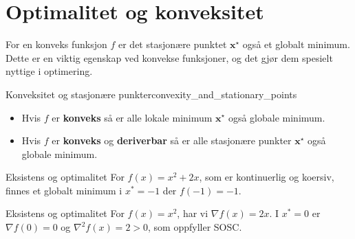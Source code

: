 \section{Optimalitet og konveksitet}
\label{sec:optimality_and_convexity}
For en konveks funksjon \(f\) er det stasjonære punktet \(\mathbf{x}^\star\) også et globalt minimum. Dette er en viktig egenskap ved konvekse funksjoner, og det gjør dem spesielt nyttige i optimering.

\begin{remark}{Konveksitet og stasjonære punkter}{convexity_and_stationary_points}
	\begin{itemize}
		\item Hvis \(f\) er \textbf{konveks} så er alle lokale minimum \(\mathbf{x}^\star\) også globale minimum.
		\item Hvis \(f\) er \textbf{konveks} og \textbf{deriverbar} så er alle stasjonære punkter \(\mathbf{x}^\star\) også globale minimum.
	\end{itemize}
\end{remark}

\begin{example}{Eksistens og optimalitet}{}
	For \( f(x) = x^2 + 2x \), som er kontinuerlig og koersiv, finnes et globalt minimum i \( x^* = -1 \) der \( f(-1) = -1 \).
\end{example}
\begin{example}{Eksistens og optimalitet}{}
	For \( f(x) = x^2 \), har vi \( \nabla f(x) = 2x \). I \( x^* = 0 \) er \( \nabla f(0) = 0 \) og \( \nabla^2 f(x) = 2 > 0 \), som oppfyller SOSC.
\end{example}

